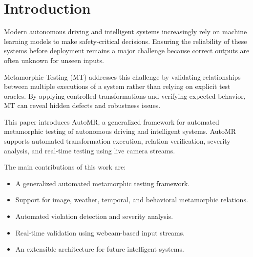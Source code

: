 \section{Introduction}

Modern autonomous driving and intelligent systems increasingly rely on machine learning models to make safety-critical decisions. Ensuring the reliability of these systems before deployment remains a major challenge because correct outputs are often unknown for unseen inputs.

Metamorphic Testing (MT) addresses this challenge by validating relationships between multiple executions of a system rather than relying on explicit test oracles. By applying controlled transformations and verifying expected behavior, MT can reveal hidden defects and robustness issues.

This paper introduces AutoMR, a generalized framework for automated metamorphic testing of autonomous driving and intelligent systems. AutoMR supports automated transformation execution, relation verification, severity analysis, and real-time testing using live camera streams.

The main contributions of this work are:

\begin{itemize}
\item A generalized automated metamorphic testing framework.
\item Support for image, weather, temporal, and behavioral metamorphic relations.
\item Automated violation detection and severity analysis.
\item Real-time validation using webcam-based input streams.
\item An extensible architecture for future intelligent systems.
\end{itemize}